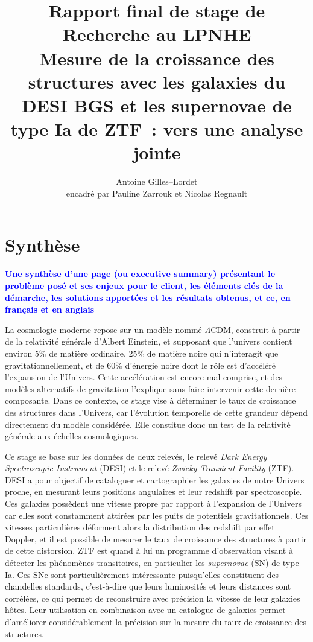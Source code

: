 \documentclass{book}
\title{Rapport final de stage de Recherche au LPNHE\\\vspace{.3em} \large Mesure de la croissance des structures avec les galaxies du DESI BGS et les supernovae de type Ia de ZTF~: vers une analyse jointe}
\author{Antoine Gilles--Lordet\\ \vspace{.1em} \small encadré par Pauline Zarrouk et Nicolas Regnault }
\date{}
\newcommand{\consignes}[1]{{\textcolor{blue}{\bf \large #1}}}
\begin{document}
\maketitle

\tableofcontents

\chapter{Synthèse}

\consignes{Une synthèse d’une page (ou executive summary) présentant le problème posé et ses enjeux pour le client, les éléments clés de la démarche, les solutions apportées et les résultats obtenus, et ce, en français et en anglais}

La cosmologie moderne repose sur un modèle nommé $\Lambda$CDM, construit à partir de la relativité générale d'Albert Einstein, et supposant que l'univers contient environ 5\% de matière ordinaire, 25\% de matière noire qui n'interagit que gravitationnellement, et de 60\% d'énergie noire dont le rôle est d'accéléré l'expansion de l'Univers. Cette accélération est encore mal comprise, et des modèles alternatifs de gravitation l'explique sans faire intervenir cette dernière composante. Dans ce contexte, ce stage vise à déterminer le taux de croissance des structures dans l'Univers, car l'évolution temporelle de cette grandeur dépend directement du modèle considérée. Elle constitue donc un test de la relativité générale aux échelles cosmologiques.

Ce stage se base sur les données de deux relevés, le relevé \textit{Dark Energy Spectroscopic Instrument} (DESI) et le relevé \textit{Zwicky Transient Facility} (ZTF). DESI a pour objectif de cataloguer et cartographier les galaxies de notre Univers proche, en mesurant leurs positions angulaires et leur redshift par spectroscopie. Ces galaxies possèdent une vitesse propre par rapport à l'expansion de l'Univers car elles sont constamment attirées par les puits de potentiels gravitationnels. Ces vitesses particulières déforment alors la distribution des redshift par effet Doppler, et il est possible de mesurer le taux de croissance des structures à partir de cette distorsion. ZTF est quand à lui un programme d'observation visant à détecter les phénomènes transitoires, en particulier les \textit{supernovae} (SN) de type Ia. Ces SNe sont particulièrement intéressante puisqu'elles constituent des chandelles standards, c'est-à-dire que leurs luminosités et leurs distances sont corrélées, ce qui permet de reconstruire avec précision la vitesse de leur galaxies hôtes. Leur utilisation en combinaison avec un catalogue de galaxies permet d'améliorer considérablement la précision sur la mesure du taux de croissance des structures.
\end{document}
